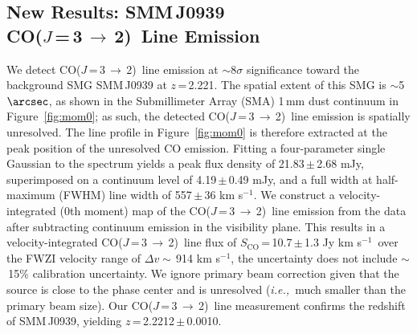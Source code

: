 \documentclass[twocolumn,apj,numberedappendix]{emulateapj}
\newcommand{\CO}{\mbox{CO($J$\,=\,3\,$\rightarrow$\,2) }}
\newcommand{\ie}{{\sl i.e.,~}}
\newcommand{\pmOne}{\mbox{$^{-1}$}}
\begin{document}
\subsection{New Results: SMM\,J0939\\ \CO Line Emission}
We detect \CO line emission at $\sim$8$\sigma$ significance toward the background SMG SMM\,J0939 at $z$\,=\,2.221.
The spatial extent of this SMG is $\sim$5$\arcsec$, as shown in the Submillimeter Array (SMA) 1\,mm dust continuum in Figure~\ref{fig:mom0}; as such, the detected \CO line emission is spatially unresolved. 
The line profile in Figure~\ref{fig:mom0} is therefore extracted at the peak position of the unresolved CO emission. Fitting a four-parameter single Gaussian to the spectrum yields a peak flux density of 21.83\,$\pm$\,2.68\,\,mJy, superimposed on a continuum level of 4.19\,$\pm$\,0.49\,\,mJy, and a full width at half-maximum (FWHM) line width of 557\,$\pm$\,36\,\,km\,\,s\pmOne. 
We construct a velocity-integrated (0th moment) map of the \CO line 
emission from the data after subtracting continuum emission in the visibility plane. This results in a velocity-integrated \CO line flux of $S_\textrm{CO}$\,=\,10.7\,$\pm$\,1.3 Jy km\,\,s\pmOne\ over the FWZI velocity range of $\Delta v\sim$\,914 km\,\,s\pmOne, the uncertainty does not include $\sim$\,15\% calibration uncertainty. We ignore primary beam correction given that the source is close to the phase center and is unresolved (\ie much smaller than the primary beam size). Our \CO line measurement confirms the redshift of SMM\,J0939, yielding $z$\,=\,2.2212\,$\pm$\,0.0010.
\end{document}
